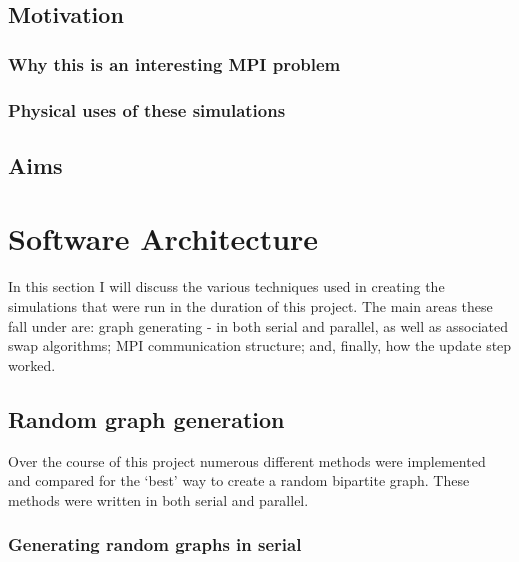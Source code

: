 \documentclass[pdftex,12pt,a4paper]{article}
\begin{document}

\subsection{Motivation}


\subsubsection{Why this is an interesting MPI problem}


\subsubsection{Physical uses of these simulations}


\subsection{Aims}

\newpage


\section{Software Architecture}

In this section I will discuss the various techniques used in creating the simulations that were run in the duration of this project. The main areas these fall under are: graph generating - in both serial and parallel, as well as associated swap algorithms; MPI communication structure; and, finally, how the update step worked.

\subsection{Random graph generation}

Over the course of this project numerous different methods were implemented and compared for the `best' way to create a random bipartite graph. These methods were written in both serial and parallel.

\subsubsection{Generating random graphs in serial}
\end{document}
